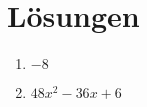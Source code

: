 \documentclass{article}%
\begin{document}
\section*{Lösungen}%
\begin{enumerate}%
\item%
$-8$%
\newline%
\item%
$48 x^{2} - 36 x + 6$%
\newline%
\end{enumerate}%
\newpage

%
\end{document}
